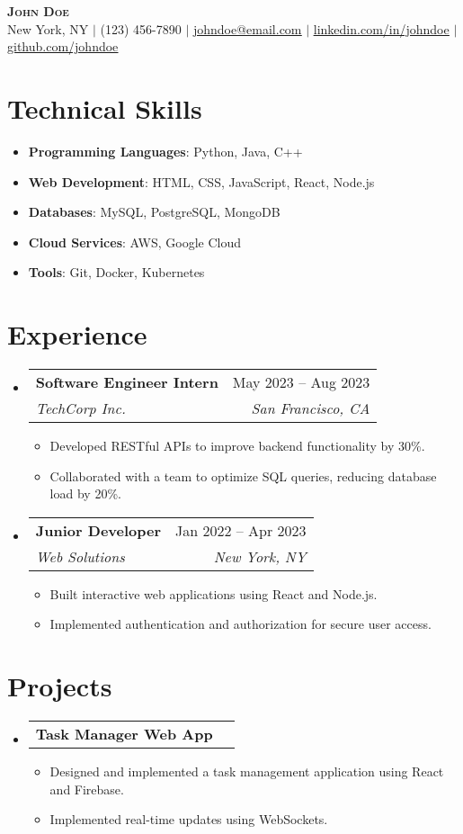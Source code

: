 \documentclass[letterpaper,10pt]{article}
\makeatletter
\newcommand{\resumeItem}[1]{
  \item\small{
    {#1 \vspace{-2pt}}
  }
}
\newcommand{\resumeSubheading}[4]{
  \vspace{-2pt}\item
    \begin{tabular*}{0.97\textwidth}[t]{l@{\extracolsep{\fill}}r}
      \textbf{#1} & #2 \\
      \textit{\small#3} & \textit{\small #4} \\
    \end{tabular*}\vspace{-7pt}
}
\newcommand{\resumeProjectHeading}[2]{
    \item
    \begin{tabular*}{0.97\textwidth}{l@{\extracolsep{\fill}}r}
      \small#1 & #2 \\
    \end{tabular*}\vspace{-7pt}
}
\newcommand{\resumeSubHeadingListStart}{\begin{itemize}[leftmargin=0.15in, label={}]}
\newcommand{\resumeSubHeadingListEnd}{\end{itemize}}
\newcommand{\resumeItemListStart}{\begin{itemize}}
\newcommand{\resumeItemListEnd}{\end{itemize}\vspace{-5pt}}
\makeatother
\begin{document}
\begin{center}
    \textbf{\Huge \scshape John Doe} \\ \vspace{1pt}
    \small New York, NY $|$ (123) 456-7890 $|$ \href{mailto:johndoe@email.com}{\underline{johndoe@email.com}} $|$ 
    \href{https://www.linkedin.com/in/johndoe/}{\underline{linkedin.com/in/johndoe}} $|$
    \href{https://github.com/johndoe}{\underline{github.com/johndoe}}
\end{center}

\section{Technical Skills}
  \resumeSubHeadingListStart
    \resumeItemListStart
      \resumeItem{\textbf{Programming Languages}: Python, Java, C++}
      \resumeItem{\textbf{Web Development}: HTML, CSS, JavaScript, React, Node.js}
      \resumeItem{\textbf{Databases}: MySQL, PostgreSQL, MongoDB}
      \resumeItem{\textbf{Cloud Services}: AWS, Google Cloud}
      \resumeItem{\textbf{Tools}: Git, Docker, Kubernetes}
    \resumeItemListEnd
  \resumeSubHeadingListEnd

\section{Experience}
  \resumeSubHeadingListStart
    \resumeSubheading
      {Software Engineer Intern}{May 2023 -- Aug 2023}
      {TechCorp Inc.}{San Francisco, CA}
      \resumeItemListStart
        \resumeItem{Developed RESTful APIs to improve backend functionality by 30\%.}
        \resumeItem{Collaborated with a team to optimize SQL queries, reducing database load by 20\%.}
      \resumeItemListEnd

    \resumeSubheading
      {Junior Developer}{Jan 2022 -- Apr 2023}
      {Web Solutions}{New York, NY}
      \resumeItemListStart
        \resumeItem{Built interactive web applications using React and Node.js.}
        \resumeItem{Implemented authentication and authorization for secure user access.}
      \resumeItemListEnd
  \resumeSubHeadingListEnd

\section{Projects}
    \resumeSubHeadingListStart
      \resumeProjectHeading
          {\textbf{Task Manager Web App}}{} 
          \resumeItemListStart
            \resumeItem{Designed and implemented a task management application using React and Firebase.}
            \resumeItem{Implemented real-time updates using WebSockets.}
          \resumeItemListEnd
    \resumeSubHeadingListEnd
\end{document}
